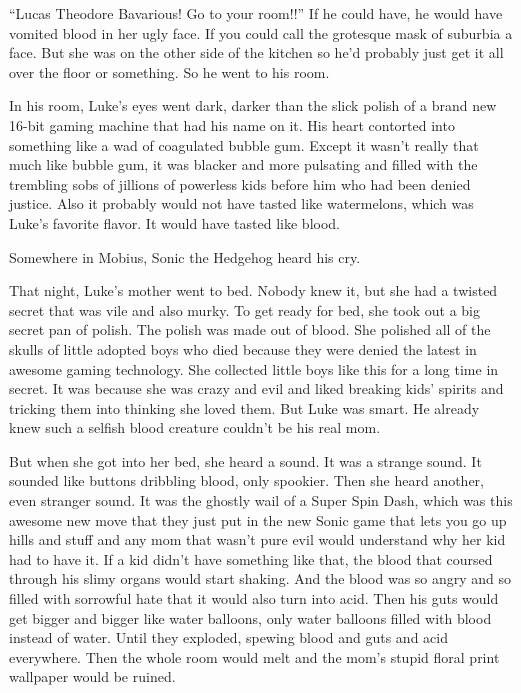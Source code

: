 ``Lucas Theodore Bavarious! Go to your room!!'' If he
could have, he would have vomited blood in her ugly face. If you
could call the grotesque mask of suburbia a face. But she was on
the other side of the kitchen so he'd probably just get it
all over the floor or something. So he went to his room.



In his room, Luke's eyes went dark, darker than the slick
polish of a brand new 16-bit gaming machine that had his name on
it. His heart contorted into something like a wad of coagulated
bubble gum. Except it wasn't really that much like bubble
gum, it was blacker and more pulsating and filled with the
trembling sobs of jillions of powerless kids before him who had
been denied justice. Also it probably would not have tasted like
watermelons, which was Luke's favorite flavor. It would have
tasted like blood.



Somewhere in Mobius, Sonic the Hedgehog heard his cry.



That night, Luke's mother went to bed. Nobody knew it, but
she had a twisted secret that was vile and also murky. To get ready
for bed, she took out a big secret pan of polish. The polish was
made out of blood. She polished all of the skulls of little adopted
boys who died because they were denied the latest in awesome gaming
technology. She collected little boys like this for a long time in
secret. It was because she was crazy and evil and liked breaking
kids' spirits and tricking them into thinking she loved them.
But Luke was smart. He already knew such a selfish blood creature
couldn't be his real mom.



But when she got into her bed, she heard a sound. It was a strange
sound. It sounded like buttons dribbling blood, only spookier. Then
she heard another, even stranger sound. It was the ghostly wail of
a Super Spin Dash, which was this awesome new move that they just
put in the new Sonic game that lets you go up hills and stuff and
any mom that wasn't pure evil would understand why her kid
had to have it. If a kid didn't have something like that, the
blood that coursed through his slimy organs would start shaking.
And the blood was so angry and so filled with sorrowful hate that
it would also turn into acid. Then his guts would get bigger and
bigger like water balloons, only water balloons filled with blood
instead of water. Until they exploded, spewing blood and guts and
acid everywhere. Then the whole room would melt and the mom's
stupid floral print wallpaper would be ruined.




